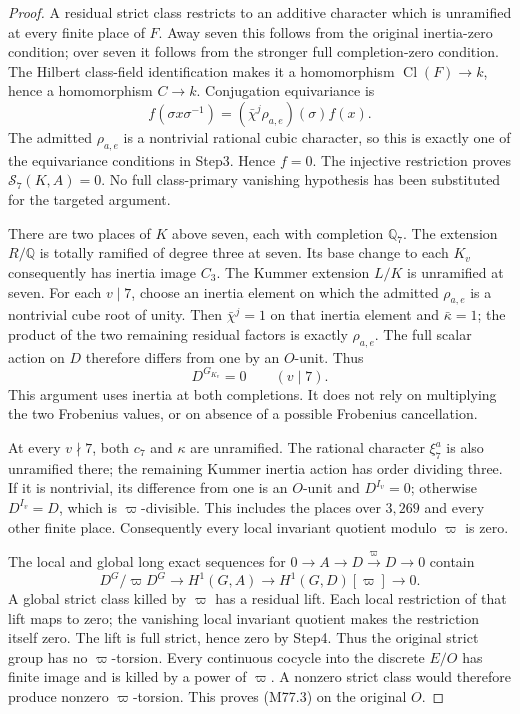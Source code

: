 \begin{proof}
A residual strict class restricts to an additive character
which is unramified at every finite place of $F$.
Away seven this follows from the original inertia-zero
condition; over seven it follows from the stronger full
completion-zero condition. The Hilbert class-field
identification makes it a homomorphism
$\operatorname{Cl}(F)\to k$, hence a homomorphism $C\to k$.
Conjugation equivariance is
\[
 f(\sigma x\sigma^{-1})=
                  (\bar\chi^j\rho_{a,e})(\sigma)f(x).
 \tag{M77.21}
\]
The admitted $\rho_{a,e}$ is a nontrivial rational cubic
character, so this is exactly one of the equivariance
conditions in Step3. Hence $f=0$.
The injective restriction proves
$\mathcal S_7(K,A)=0$. No full class-primary vanishing
hypothesis has been substituted for the targeted argument.

There are two places of $K$ above seven, each with completion
$\mathbb Q_7$. The extension $R/\mathbb Q$ is totally
ramified of degree three at seven. Its base change to each
$K_v$ consequently has inertia image $C_3$.
The Kummer extension $L/K$ is unramified at seven.
For each $v\mid7$, choose an inertia element on which
the admitted $\rho_{a,e}$ is a nontrivial cube root of unity.
Then $\bar\chi^j=1$ on that inertia element and
$\bar\kappa=1$; the product of the two remaining residual
factors is exactly $\rho_{a,e}$.
The full scalar action on $D$ therefore differs from one
by an $O$-unit. Thus
\[
                              D^{G_{K_v}}=0\qquad(v\mid7).
 \tag{M77.22}
\]
This argument uses inertia at both completions. It does
not rely on multiplying the two Frobenius values, or on
absence of a possible Frobenius cancellation.

At every $v\nmid7$, both $c_7$ and $\kappa$ are unramified.
The rational character $\xi_7^a$ is also unramified there;
the remaining Kummer inertia action has order dividing three.
If it is nontrivial, its difference from one is an
$O$-unit and $D^{I_v}=0$; otherwise $D^{I_v}=D$, which is
$\varpi$-divisible. This includes the places over $3,269$
and every other finite place. Consequently every local
invariant quotient modulo $\varpi$ is zero.

The local and global long exact sequences for
$0\to A\to D\xrightarrow{\varpi}D\to0$ contain
\[
 D^G/\varpi D^G\longrightarrow H^1(G,A)
                      \longrightarrow H^1(G,D)[\varpi]
                      \longrightarrow0.
 \tag{M77.23}
\]
A global strict class killed by $\varpi$ has a residual
lift. Each local restriction of that lift maps to zero;
the vanishing local invariant quotient makes the restriction
itself zero. The lift is full strict, hence zero by Step4.
Thus the original strict group has no $\varpi$-torsion.
Every continuous cocycle into the discrete $E/O$ has finite
image and is killed by a power of $\varpi$. A nonzero
strict class would therefore produce nonzero
$\varpi$-torsion. This proves (M77.3) on the original $O$.


\end{proof}
